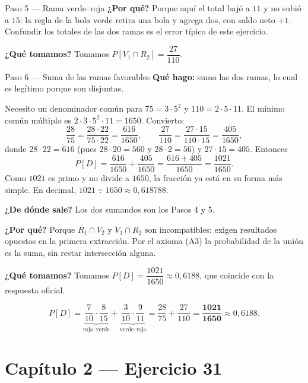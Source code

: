 \documentclass[11pt]{article}
\begin{document}
\begin{sol}
\begin{paso}{Paso 5 --- Rama verde--roja}
\textbf{¿Por qu\'e?} Porque aqu\'i el total baj\'o a $11$ y no subi\'o a $15$: la regla de la bola verde retira una bola y agrega dos, con saldo neto $+1$. Confundir los totales de las dos ramas es el error t\'ipico de este ejercicio.

\textbf{¿Qu\'e tomamos?} Tomamos $P[V_1\cap R_2]=\dfrac{27}{110}$.
\end{paso}

\begin{paso}{Paso 6 --- Suma de las ramas favorables}
\textbf{Qu\'e hago:} sumo las dos ramas, lo cual es leg\'itimo porque son disjuntas.

Necesito un denominador com\'un para $75=3\cdot 5^{2}$ y $110=2\cdot 5\cdot 11$. El m\'inimo com\'un m\'ultiplo es $2\cdot 3\cdot 5^{2}\cdot 11=1650$. Convierto:
\[
\frac{28}{75}=\frac{28\cdot 22}{75\cdot 22}=\frac{616}{1650},
\qquad
\frac{27}{110}=\frac{27\cdot 15}{110\cdot 15}=\frac{405}{1650},
\]
donde $28\cdot 22=616$ (pues $28\cdot 20=560$ y $28\cdot 2=56$) y $27\cdot 15=405$. Entonces
\[
P[D]=\frac{616}{1650}+\frac{405}{1650}=\frac{616+405}{1650}=\frac{1021}{1650}.
\]
Como $1021$ es primo y no divide a $1650$, la fracci\'on ya est\'a en su forma m\'as simple. En decimal, $1021\div 1650\approx 0{,}618788$.

\textbf{¿De d\'onde sale?} Los dos sumandos son los Pasos 4 y 5.

\textbf{¿Por qu\'e?} Porque $R_1\cap V_2$ y $V_1\cap R_2$ son incompatibles: exigen resultados opuestos en la primera extracci\'on. Por el axioma (A3) la probabilidad de la uni\'on es la suma, sin restar intersecci\'on alguna.

\textbf{¿Qu\'e tomamos?} Tomamos $P[D]=\dfrac{1021}{1650}\approx 0{,}6188$, que coincide con la respuesta oficial.
\end{paso}

\end{sol}

\begin{resp}
\[
P[D]=\underbrace{\frac{7}{10}\cdot\frac{8}{15}}_{\text{roja--verde}}+\underbrace{\frac{3}{10}\cdot\frac{9}{11}}_{\text{verde--roja}}
=\frac{28}{75}+\frac{27}{110}
=\mathbf{\frac{1021}{1650}}\approx 0{,}6188 .
\]
\end{resp}

\section*{Cap\'itulo 2 --- Ejercicio 31}
\end{document}
